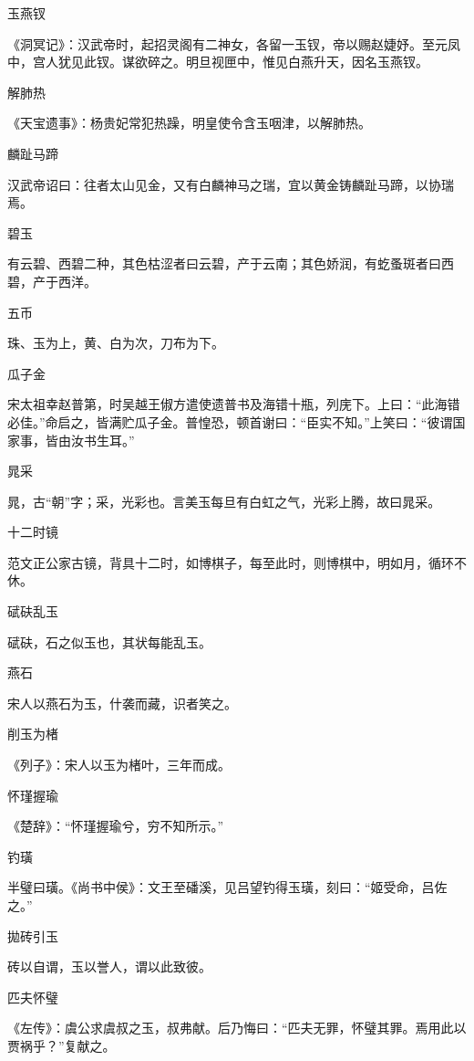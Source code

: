 \documentclass[a4paper,12pt,UTF8,twoside]{ctexbook}
\begin{document}
    玉燕钗
    
    《洞冥记》：汉武帝时，起招灵阁有二神女，各留一玉钗，帝以赐赵婕妤。至元凤中，宫人犹见此钗。谋欲碎之。明旦视匣中，惟见白燕升天，因名玉燕钗。
    
    解肺热
    
    《天宝遗事》：杨贵妃常犯热躁，明皇使令含玉咽津，以解肺热。
    
    麟趾马蹄
    
    汉武帝诏曰：往者太山见金，又有白麟神马之瑞，宜以黄金铸麟趾马蹄，以协瑞焉。
    
    碧玉
    
    有云碧、西碧二种，其色枯涩者曰云碧，产于云南；其色娇润，有虼蚤斑者曰西碧，产于西洋。
    
    五币
    
    珠、玉为上，黄、白为次，刀布为下。
    
    瓜子金
    
    宋太祖幸赵普第，时吴越王俶方遣使遗普书及海错十瓶，列庑下。上曰：“此海错必佳。”命启之，皆满贮瓜子金。普惶恐，顿首谢曰：“臣实不知。”上笑曰：“彼谓国家事，皆由汝书生耳。”
    
    晁采
    
    晁，古“朝”字；采，光彩也。言美玉每旦有白虹之气，光彩上腾，故曰晁采。
    
    十二时镜
    
    范文正公家古镜，背具十二时，如博棋子，每至此时，则博棋中，明如月，循环不休。
    
    碔砆乱玉
    
    碔砆，石之似玉也，其状每能乱玉。
    
    燕石
    
    宋人以燕石为玉，什袭而藏，识者笑之。
    
    削玉为楮
    
    《列子》：宋人以玉为楮叶，三年而成。
    
    怀瑾握瑜
    
    《楚辞》：“怀瑾握瑜兮，穷不知所示。”
    
    钓璜
    
    半璧曰璜。《尚书中侯》：文王至磻溪，见吕望钓得玉璜，刻曰：“姬受命，吕佐之。”
    
    拋砖引玉
    
    砖以自谓，玉以誉人，谓以此致彼。
    
    匹夫怀璧
    
    《左传》：虞公求虞叔之玉，叔弗献。后乃悔曰：“匹夫无罪，怀璧其罪。焉用此以贾祸乎？”复献之。
    
\end{document}
